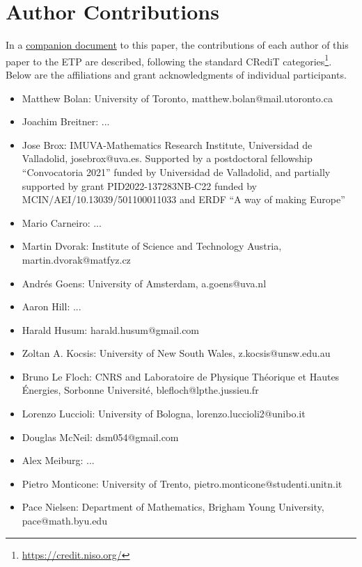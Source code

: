 \section{Author Contributions}

In a \href{https://github.com/teorth/equational_theories/blob/main/paper/contributions.md}{companion document} to this paper, the contributions of each author of this paper to the ETP are described, following the standard CRediT categories\footnote{\url{https://credit.niso.org/}}.  Below are the affiliations and grant acknowledgments of individual participants.  


\begin{itemize}
    \item Matthew Bolan: University of Toronto, matthew.bolan@mail.utoronto.ca
    \item Joachim Breitner: ...
    \item Jose Brox: IMUVA-Mathematics Research Institute, Universidad de Valladolid, josebrox@uva.es. Supported by a postdoctoral fellowship “Convocatoria 2021” funded by Universidad de Valladolid, and partially supported by grant PID2022-137283NB-C22 funded by MCIN/AEI/10.13039/501100011033 and ERDF “A way of making Europe”
    \item Mario Carneiro: ...
    \item Martin Dvorak: Institute of Science and Technology Austria, martin.dvorak@matfyz.cz
    \item Andr\'es Goens: University of Amsterdam, a.goens@uva.nl
    \item Aaron Hill: ...
    \item Harald Husum: harald.husum@gmail.com
    \item Zoltan A. Kocsis: University of New South Wales, z.kocsis@unsw.edu.au
    \item Bruno Le Floch: CNRS and Laboratoire de Physique Th\'eorique et Hautes \'Energies, Sorbonne Universit\'e, blefloch@lpthe.jussieu.fr
    \item Lorenzo Luccioli: University of Bologna, lorenzo.luccioli2@unibo.it
    \item Douglas McNeil: dsm054@gmail.com
    \item Alex Meiburg: ...
    \item Pietro Monticone: University of Trento, pietro.monticone@studenti.unitn.it
    \item Pace Nielsen: Department of Mathematics, Brigham Young University, pace@math.byu.edu

\end{itemize}
